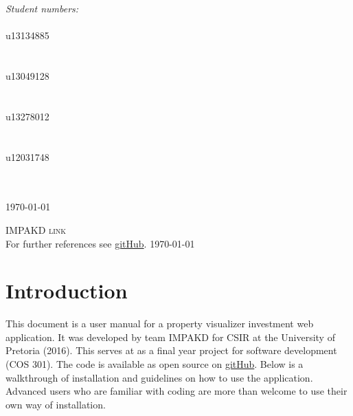 \documentclass[a4paper,12pt]{article}
\begin{document}
\begin{titlepage}
\begin{center}
\begin{minipage}{0.4\textwidth}
\begin{flushright}
\emph{ \Large Student numbers:} \\[0.4cm]  
\emph{}\\
{\Large u13134885}\\
\emph{}\\
\emph{}\\
{\Large u13049128}\\
\emph{}\\
\emph{}\\
{\Large u13278012}\\
\emph{}\\
\emph{}\\
{\Large u12031748}\\
\emph{}\\
\emph{}\\

\end{flushright}
\end{minipage}


{\large \today}
\end{center}
\end{titlepage}
\renewcommand{\thesection}{\arabic{section}}

\newpage
\begin{center}
\textsc{\Large IMPAKD link}\\[0.5cm]
For further references see \href{https://github.com/u13278012/IMPAKD/}{gitHub}.
\today
\end{center}
\newpage
\tableofcontents{}

\newpage 
\section{Introduction}
This document is a user manual for a property visualizer investment web application. It was developed by team IMPAKD for CSIR at the University of Pretoria (2016). This serves at as a final year project for software development (COS 301). The code is available as open source on \href{https://github.com/u13278012/IMPAKD/}{gitHub}. Below is a walkthrough of installation and guidelines on how to use the application. Advanced users who are familiar with coding are more than welcome to use their own way of installation. 
\end{document}
